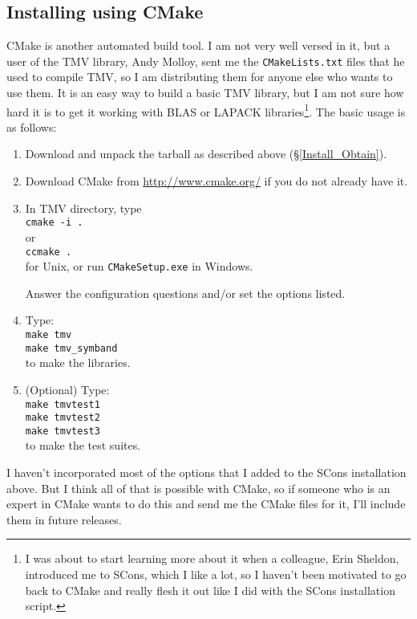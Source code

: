 \documentclass[twoside,letterpaper,11pt]{article}
\begin{document}
\subsection{Installing using CMake}
\label{Install_CMake}

CMake is another automated build tool.  I am not very well versed in it, but a user of the 
TMV library, Andy Molloy, sent me the \texttt{CMakeLists.txt} files that he used to compile TMV,
so I am distributing them for anyone else who wants
to use them.  It is an easy way to build a basic TMV library, but I am not sure how hard it is
to get it working with BLAS or LAPACK libraries\footnote{
I was about to start learning more about it when a colleague, Erin Sheldon, introduced me to
SCons, which I like a lot, so I haven't been motivated to go back to CMake and really flesh
it out like I did with the SCons installation script.}.
The basic usage is as follows:

\begin{enumerate}
\item Download and unpack the tarball as described above (\S\ref{Install_Obtain}).

\item
Download CMake from \url{http://www.cmake.org/} if you do not already have it.

\item
In TMV directory, type\\
\texttt{cmake -i .}\\
or\\
\texttt{ccmake .}\\
for Unix, or run \texttt{CMakeSetup.exe} in Windows.

Answer the configuration questions and/or set the options listed.

\item
Type:\\
\texttt{make tmv}\\
\texttt{make tmv\_symband}\\
to make the libraries.

\item
(Optional) Type:\\
\texttt{make tmvtest1}\\
\texttt{make tmvtest2}\\
\texttt{make tmvtest3}\\
to make the test suites.

\end{enumerate}

I haven't incorporated most of the options that I added to the SCons installation above.
But I think all of that is possible with CMake, so if someone who is an expert in CMake wants
to do this and send me the CMake files for it, I'll include them in future releases.
\end{document}
